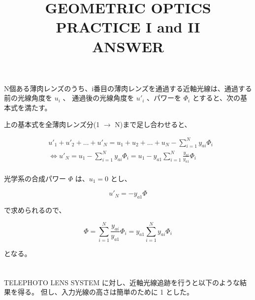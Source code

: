 \documentclass[a4paper,10pt]{jsarticle}
\begin{document}
\title{GEOMETRIC OPTICS PRACTICE  I and II \\ ANSWER}
\author{}
\date{}
\maketitle



\section{}
N個ある薄肉レンズのうち、i番目の薄肉レンズを通過する近軸光線は、通過する前の光線角度を $u_i$ 、
通過後の光線角度を $u'_i$ 、パワーを $\Phi_i$ とすると、次の基本式を満たす。

\vspace{1\baselineskip}

\begin{center}
\end{center}

\vspace{1\baselineskip}

上の基本式を全薄肉レンズ分(1 $\to$ N)まで足し合わせると、

\begin{align*}
& u'_1 + u'_2 + \dots + u'_N = u_1 + u_2 + \dots + u_N - \sum_{i=1}^{N} y_{ai}\Phi_{i} \\
& \iff u'_N = u_1 - \sum_{i=1}^{N} y_{ai}\Phi_{i} = u_1 - y_{a1} \sum_{i=1}^{N} \frac{y_{ai}}{y_{a1}}\Phi_{i} \\
\end{align*}

光学系の合成パワー $\Phi$ は、$ u_{1} = 0 $ とし、

\begin{equation*}
u'_N = - y_{a1} \Phi
\end{equation*}

で求められるので、

\begin{equation*}
\Phi = \sum_{i=1}^{N} \frac{y_{ai}}{y_{a1}}\Phi_{i} = y_{a1} \sum_{i=1}^{N} y_{ai} \Phi_{i}
\end{equation*}

となる。






\section{}
TELEPHOTO LENS SYSTEM に対し、近軸光線追跡を行うと以下のような結果を得る。
但し、入力光線の高さは簡単のために 1 とした。
\end{document}

